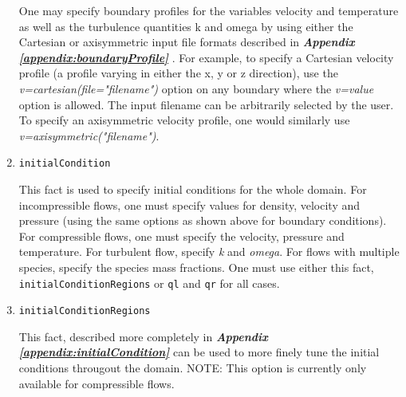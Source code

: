 \documentclass{article}
\begin{document}
\begin{enumerate}

One may specify boundary profiles for the variables velocity and temperature as
well as the turbulence quantities k and omega by using either the Cartesian or
axisymmetric input file formats described in \emph{\bf Appendix
\ref{appendix:boundaryProfile}} . For
example, to specify a Cartesian velocity profile (a profile varying in either
the x, y or z direction), use the \emph{v=cartesian(file="filename")} option on any
boundary where the \emph{v=value} option is allowed. The input filename can be
arbitrarily selected by the user. To specify an axisymmetric velocity profile,
one would similarly use \emph{v=axisymmetric("filename")}.

\item{\tt initialCondition}

This fact is used to specify initial conditions for the whole domain. For incompressible
flows, one must specify values for density, velocity and pressure (using the
same options as shown above for boundary conditions). For compressible flows,
one must specify the velocity, pressure and temperature. For turbulent flow,
specify \emph{k} and \emph{omega}. For flows with multiple species, specify the
species mass fractions. One must use either this fact,
{\tt initialConditionRegions} or {\tt ql} and {\tt qr} for all cases.

\item{\tt initialConditionRegions}

This fact, described more completely in \emph{\bf Appendix \ref{appendix:initialCondition}}
can be used to more finely tune the initial conditions througout the domain.
NOTE: This option is currently only available for compressible flows.


\end{enumerate}
\end{document}
